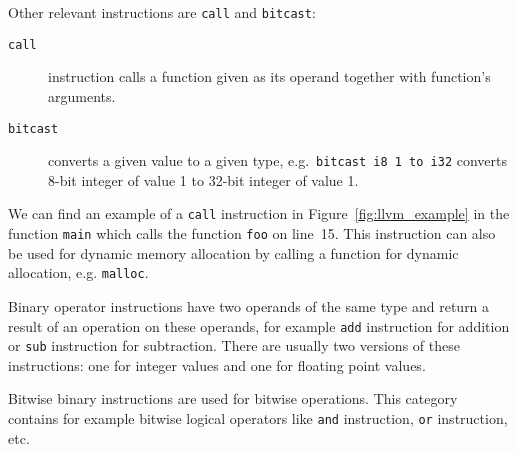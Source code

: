 Other relevant instructions are \texttt{call} and \texttt{bitcast}:
\begin{description}
\item[\texttt{call}] instruction calls a function given as its
operand together with function's arguments.
\item[\texttt{bitcast}] converts a given value to a given type, e.g.~\texttt{bitcast i8 1 to
i32} converts 8-bit integer of value 1 to 32-bit integer of value 1.
\end{description}
 We can find an example of a \texttt{call} instruction in
 Figure~\ref{fig:llvm_example} in the function \texttt{main} which calls
 the function \texttt{foo} on line~15. This instruction can also be used for
 dynamic memory allocation by calling a function for dynamic allocation, e.g.
 \texttt{malloc}.

Binary operator instructions have two operands of the same type and return a
result of an operation on these operands, for example \texttt{add} instruction
for addition or \texttt{sub} instruction for subtraction. There are usually two
versions of these instructions: one for integer values and one for floating
point values.

Bitwise binary instructions are used for bitwise operations. This category
contains for example bitwise logical operators like \texttt{and} instruction,
\texttt{or} instruction, etc.



